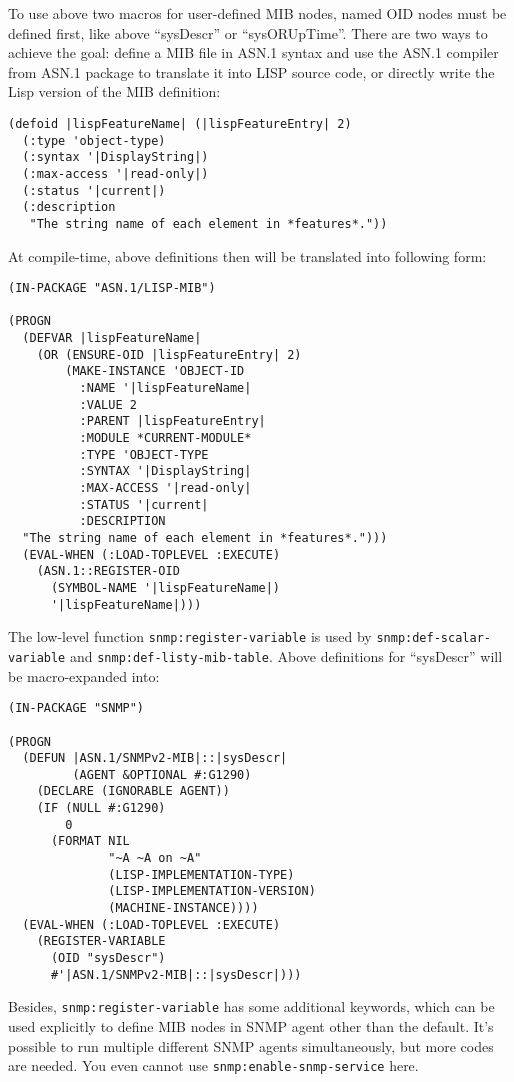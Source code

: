 \documentclass[reprint,9pt]{sigplanconf}
\begin{document}
To use above two macros for user-defined MIB nodes, named OID nodes
must be defined first, like above ``sysDescr'' or
``sysORUpTime''. There are two ways to achieve the goal: define a
MIB file in ASN.1 syntax and use the ASN.1 compiler from ASN.1 package to
translate it into LISP source code, or
directly write the Lisp version of the MIB definition:

\begin{verbatim}
(defoid |lispFeatureName| (|lispFeatureEntry| 2)
  (:type 'object-type)
  (:syntax '|DisplayString|)
  (:max-access '|read-only|)
  (:status '|current|)
  (:description
   "The string name of each element in *features*."))
\end{verbatim}

At compile-time, above definitions then will be translated into following form:
\begin{verbatim}
(IN-PACKAGE "ASN.1/LISP-MIB")

(PROGN
  (DEFVAR |lispFeatureName|
    (OR (ENSURE-OID |lispFeatureEntry| 2)
        (MAKE-INSTANCE 'OBJECT-ID
          :NAME '|lispFeatureName|
          :VALUE 2
          :PARENT |lispFeatureEntry|
          :MODULE *CURRENT-MODULE*
          :TYPE 'OBJECT-TYPE
          :SYNTAX '|DisplayString|
          :MAX-ACCESS '|read-only|
          :STATUS '|current|
          :DESCRIPTION
  "The string name of each element in *features*.")))
  (EVAL-WHEN (:LOAD-TOPLEVEL :EXECUTE)
    (ASN.1::REGISTER-OID
      (SYMBOL-NAME '|lispFeatureName|)
      '|lispFeatureName|)))
\end{verbatim}

The low-level function \texttt{snmp:register-variable} is used by
\texttt{snmp:def-scalar-variable} and
\texttt{snmp:def-listy-mib-table}.  Above definitions for ``sysDescr''
will be macro-expanded into:
%
\begin{verbatim}
(IN-PACKAGE "SNMP")

(PROGN
  (DEFUN |ASN.1/SNMPv2-MIB|::|sysDescr|
         (AGENT &OPTIONAL #:G1290)
    (DECLARE (IGNORABLE AGENT))
    (IF (NULL #:G1290)
        0
      (FORMAT NIL
              "~A ~A on ~A"
              (LISP-IMPLEMENTATION-TYPE)
              (LISP-IMPLEMENTATION-VERSION)
              (MACHINE-INSTANCE))))
  (EVAL-WHEN (:LOAD-TOPLEVEL :EXECUTE)
    (REGISTER-VARIABLE
      (OID "sysDescr")
      #'|ASN.1/SNMPv2-MIB|::|sysDescr|)))
\end{verbatim}

Besides, \texttt{snmp:register-variable} has some additional keywords, which
can be used explicitly to define MIB nodes in SNMP agent other than
the default. It's possible to run multiple different SNMP agents
simultaneously, but more codes are needed. You even cannot use
\texttt{snmp:enable-snmp-service} here.
\end{document}
